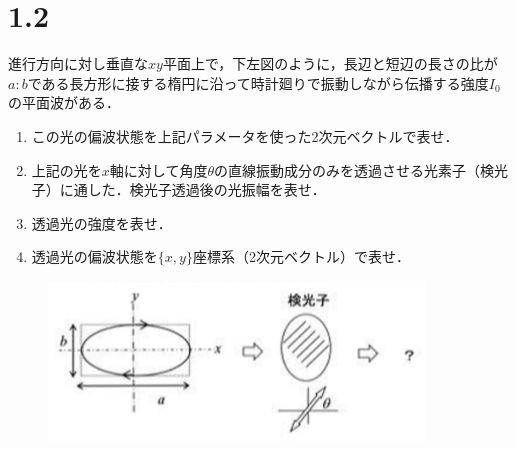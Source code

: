 \section*{1.2}
進行方向に対し垂直な$xy$平面上で，下左図のように，長辺と短辺の長さの比が$a:b$である長方形に接する楕円に沿って時計廻りで振動しながら伝播する強度$I_0$の平面波がある．
\begin{enumerate}
    \renewcommand{\labelenumi}{(\alph{enumi})}
    \item この光の偏波状態を上記パラメータを使った2次元ベクトルで表せ．
    \item 上記の光を$x$軸に対して角度$\theta$の直線振動成分のみを透過させる光素子（検光子）に通した．検光子透過後の光振幅を表せ．
    \item 透過光の強度を表せ．
    \item 透過光の偏波状態を$\{x,y\}$座標系（2次元ベクトル）で表せ．
\end{enumerate}

\begin{figure}[H]
    \begin{center}
        \includegraphics[width=100mm]{./figures/section/figure_1.eps}
    \end{center}
\end{figure}

